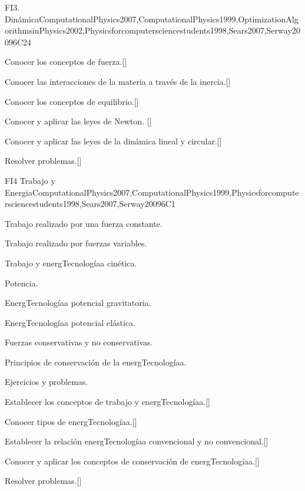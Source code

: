 \begin{syllabus}
\begin{unit}{}{FI3. Dinámica}{ComputationalPhysics2007,ComputationalPhysics1999,OptimizationAlgorithmsinPhysics2002,Physicsforcomputersciencestudents1998,Sears2007,Serway2009}{6}{C24}
   \begin{learningoutcomes}
      \item Conocer los conceptos de fuerza.[\Usage]
      \item Conocer las interacciones de la materia a través de la inercia.[\Usage]
      \item Conocer los conceptos de equilibrio.[\Usage]
      \item Conocer y aplicar las leyes de Newton. [\Usage]   
      \item Conocer y aplicar las leyes de la dinámica lineal y circular.[\Usage]
      \item Resolver problemas.[\Usage]
   \end{learningoutcomes}
\end{unit}

\begin{unit}{}{FI4 Trabajo y Energia}{ComputationalPhysics2007,ComputationalPhysics1999,Physicsforcomputersciencestudents1998,Sears2007,Serway2009}{6}{C1}
\begin{topics}
      \item Trabajo realizado por una fuerza constante.
      \item Trabajo realizado por fuerzas variables.
      \item Trabajo y energTecnologíaa cinética.
      \item Potencia.
      \item EnergTecnologíaa potencial gravitatoria.
      \item EnergTecnologíaa potencial elástica.
      \item Fuerzas conservativas y no conservativas.
      \item Principios de conservación de la energTecnologíaa.
      \item Ejercicios y problemas.
   \end{topics}

   \begin{learningoutcomes}
      \item Establecer los conceptos de trabajo y energTecnologíaa.[\Usage]
      \item Conocer tipos de energTecnologíaa.[\Usage]
      \item Establecer la relación energTecnologíaa convencional y no convencional.[\Usage]
      \item Conocer y aplicar los conceptos de conservación de energTecnologíaa.[\Usage]
      \item Resolver problemas.[\Usage]
   \end{learningoutcomes}
\end{unit}


\end{syllabus}
